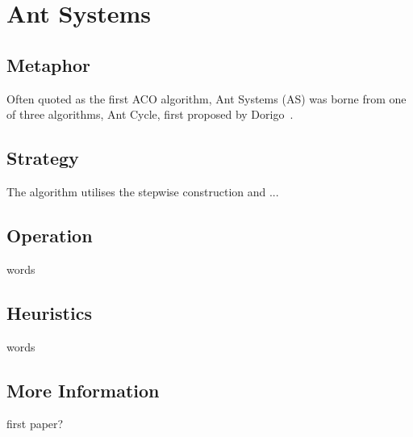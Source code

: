 %
%

%
% 
\section{Ant Systems}
\label{sec:aco:as}

%
%
\subsection{Metaphor}
Often quoted as the first ACO algorithm, Ant Systems (AS) was borne from one of three algorithms, Ant Cycle, first proposed by Dorigo~\cite{}.



%
%
\subsection{Strategy}
The algorithm utilises the stepwise construction and ...


%
%
\subsection{Operation}
words


%
%
\subsection{Heuristics}
words



%
%
\subsection{More Information}
first paper?




